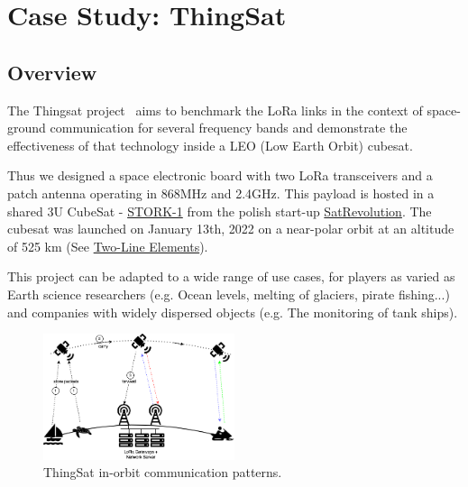 \section{Case Study: ThingSat}
\label{sec:case-study}

\subsection{Overview}

The Thingsat project~\cite{git:thingsat-repo} aims to benchmark the LoRa links in the context of
space-ground communication for several frequency bands and demonstrate the
effectiveness of that technology inside a LEO (Low Earth Orbit) cubesat. 

Thus we designed a space electronic board with two LoRa transceivers and a patch
antenna operating in 868MHz and 2.4GHz. This payload is hosted in a shared 3U
CubeSat - \href{https://space.skyrocket.de/doc_sdat/stork-1.htm}{STORK-1} from
the polish start-up \href{https://www.satrevolution.com/}{SatRevolution}. The
cubesat was launched on January 13th, 2022 on a near-polar orbit at an
altitude of 525 km (See
\href{https://www.n2yo.com/database/?q=STORK-1\#results}{Two-Line Elements}).

This project can be adapted to a wide range of use cases, for players as varied
as Earth science researchers (e.g. Ocean levels, melting of glaciers, pirate
fishing...) and companies with widely dispersed objects (e.g. The monitoring of
tank ships). 

\begin{figure}[t]
    \centering
    \includegraphics[width=0.5\textwidth]{Figures/thingsat-dtn.png}
    \caption{ThingSat in-orbit communication patterns.}
    \label{fig:thingsat-comm}
\end{figure}

